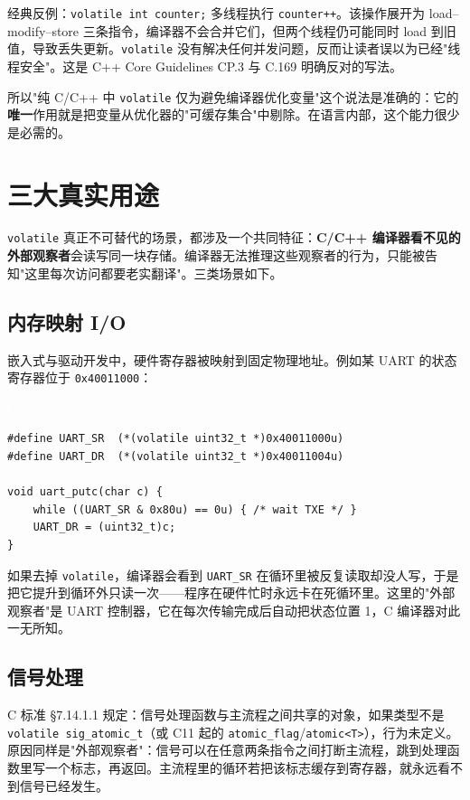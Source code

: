 \documentclass[12pt,a4paper,fontset=fandol]{ctexbook}
\newcommand{\clabel}{%
  \begin{tcolorbox}[enhanced,colback=cheadbg,colframe=cheadbg,
    arc=1mm,boxrule=0mm,left=6pt,right=6pt,top=2pt,bottom=2pt,
    halign=left,oversize]
    \textcolor{white}{\small\bfseries C}
  \end{tcolorbox}\vspace{-4pt}}
\newcommand{\cpp}[1]{C++#1}
\newcommand{\kw}[1]{\texttt{#1}}
\begin{document}
\begin{tcolorbox}[warning={volatile $\neq$ atomic}]
经典反例：\texttt{volatile int counter;} 多线程执行 \texttt{counter++}。该操作展开为 load--modify--store 三条指令，编译器不会合并它们，但两个线程仍可能同时 load 到旧值，导致丢失更新。\kw{volatile} 没有解决任何并发问题，反而让读者误以为已经"线程安全"。这是 \cpp{} Core Guidelines CP.3 与 C.169 明确反对的写法。
\end{tcolorbox}

所以"纯 C/\allowbreak{}\cpp{} 中 \kw{volatile} 仅为避免编译器优化变量"这个说法是准确的：它的\textbf{唯一}作用就是把变量从优化器的"可缓存集合"中剔除。在语言内部，这个能力很少是必需的。

\section{三大真实用途}\label{sec:volatile-real-uses}

\kw{volatile} 真正不可替代的场景，都涉及一个共同特征：\textbf{C/\allowbreak{}\cpp{} 编译器看不见的外部观察者}会读写同一块存储。编译器无法推理这些观察者的行为，只能被告知"这里每次访问都要老实翻译"。三类场景如下。

\subsection{内存映射 I/O}\label{sec:volatile-mmio}

嵌入式与驱动开发中，硬件寄存器被映射到固定物理地址。例如某 UART 的状态寄存器位于 \texttt{0x40011000}：

\clabel
\begin{lstlisting}[style=cstyle]
#define UART_SR  (*(volatile uint32_t *)0x40011000u)
#define UART_DR  (*(volatile uint32_t *)0x40011004u)

void uart_putc(char c) {
    while ((UART_SR & 0x80u) == 0u) { /* wait TXE */ }
    UART_DR = (uint32_t)c;
}
\end{lstlisting}

如果去掉 \kw{volatile}，编译器会看到 \texttt{UART\_SR} 在循环里被反复读取却没人写，于是把它提升到循环外只读一次——程序在硬件忙时永远卡在死循环里。这里的"外部观察者"是 UART 控制器，它在每次传输完成后自动把状态位置 1，C 编译器对此一无所知。

\subsection{信号处理}\label{sec:volatile-signal}

C 标准 §7.14.1.1 规定：信号处理函数与主流程之间共享的对象，如果类型不是 \texttt{volatile sig\_atomic\_t}（或 C11 起的 \texttt{atomic\_flag}/\allowbreak{}\texttt{atomic<T>}），行为未定义。原因同样是"外部观察者"：信号可以在任意两条指令之间打断主流程，跳到处理函数里写一个标志，再返回。主流程里的循环若把该标志缓存到寄存器，就永远看不到信号已经发生。
\end{document}
